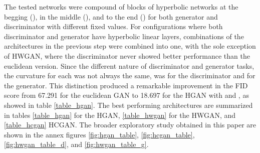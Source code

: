 \documentclass[journal]{IEEEtran}
\begin{document}
 The tested networks were compound of blocks of hyperbolic networks at the begging (), in the middle (), and to the end () for both generator and discriminator with different fixed  values. For configurations where both discriminator and generator have hyperbolic linear layers, combinations of the architectures in the previous step were combined into one, with the sole exception of HWGAN, where the discriminator never showed better performance than the euclidean version. Since the different nature of discriminator and generator tasks, the curvature for each was not always the same,  was for the discriminator and  for the generator. This distinction produced a remarkable improvement in the FID score from 67.291 for the euclidean GAN to 18.697 for the HGAN with  and , as showed in table \ref{table_hgan}. The best performing architectures are summarized in tables \ref{table_hgan} for the HGAN, \ref{table_hwgan} for the HWGAN, and \ref{table_hcgan} HCGAN. The broader exploratory study obtained in this paper are shown in the annex figures \ref{fig:hgan_table}, \ref{fig:hcgan_table}, \ref{fig:hwgan_table_d}, and \ref{fig:hwgan_table_g}. 
 
\end{document}
